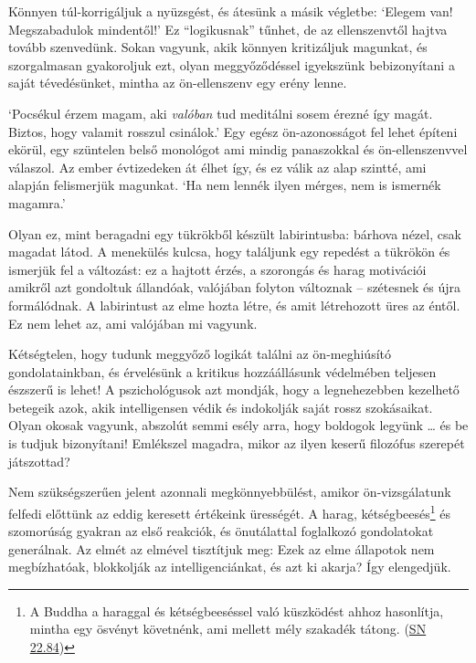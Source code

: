 
Könnyen túl-korrigáljuk a nyüzsgést, és átesünk a másik végletbe:
`Elegem van! Megszabadulok mindentől!' Ez ``logikusnak'' tűnhet, de az
ellenszenvtől hajtva tovább szenvedünk. Sokan vagyunk, akik könnyen
kritizáljuk magunkat, és szorgalmasan gyakoroljuk ezt, olyan
meggyőződéssel igyekszünk bebizonyítani a saját tévedésünket, mintha az
ön-ellenszenv egy erény lenne.

`Pocsékul érzem magam, aki \emph{valóban} tud meditálni sosem érezné így
magát. Biztos, hogy valamit rosszul csinálok.' Egy egész ön-azonosságot
fel lehet építeni ekörül, egy szüntelen belső monológot ami mindig
panaszokkal és ön-ellenszenvvel válaszol. Az ember évtizedeken át élhet
így, és ez válik az alap szintté, ami alapján felismerjük magunkat. `Ha
nem lennék ilyen mérges, nem is ismernék magamra.'

Olyan ez, mint beragadni egy tükrökből készült labirintusba: bárhova
nézel, csak magadat látod. A menekülés kulcsa, hogy találjunk egy
repedést a tükrökön és ismerjük fel a változást: ez a hajtott érzés, a
szorongás és harag motivációi amikről azt gondoltuk állandóak, valójában
folyton változnak -- szétesnek és újra formálódnak. A labirintust az
elme hozta létre, és amit létrehozott üres az éntől. Ez nem lehet az,
ami valójában mi vagyunk.

Kétségtelen, hogy tudunk meggyőző logikát találni az ön-meghiúsító
gondolatainkban, és érvelésünk a kritikus hozzáállásunk védelmében
teljesen észszerű is lehet! A pszichológusok azt mondják, hogy a
legnehezebben kezelhető betegeik azok, akik intelligensen védik és
indokolják saját rossz szokásaikat. Olyan okosak vagyunk, abszolút semmi
esély arra, hogy boldogok legyünk \ldots{} és be is tudjuk bizonyítani!
Emlékszel magadra, mikor az ilyen keserű filozófus szerepét játszottad?

Nem szükségszerűen jelent azonnali megkönnyebbülést, amikor
ön-vizsgálatunk felfedi előttünk az eddig keresett értékeink ürességét.
A harag, kétségbeesés\footnote{A Buddha a haraggal és kétségbeeséssel
  való küszködést ahhoz hasonlítja, mintha egy ösvényt követnénk, ami
  mellett mély szakadék tátong.
  (\href{https://www.accesstoinsight.org/tipitaka/sn/sn22/sn22.084.than.html}{SN
  22.84})} és szomorúság gyakran az első reakciók, és önutálattal
foglalkozó gondolatokat generálnak. Az elmét az elmével tisztítjuk meg:
Ezek az elme állapotok nem megbízhatóak, blokkolják az
intelligenciánkat, és azt ki akarja? Így elengedjük.

